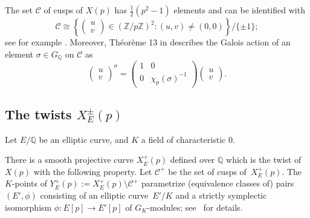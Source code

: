 \documentclass[12pt]{amsart}
\numberwithin{equation}{section}
\theoremstyle{definition}
\newcommand{\Q}{\mathbb{Q}}
\newcommand{\Z}{\mathbb{Z}}
\newcommand{\cC}{\mathcal{C}}
\begin{document}
The set $\cC$ of cusps of $X(p)$ has $\frac{1}{2}(p^2-1)$ elements and can be identified with 
\[\cC \cong \left\{\begin{pmatrix} u \\ v \end{pmatrix} \in (\Z/p\Z)^2 : (u, v) \neq (0,0) \right\} / \{ \pm 1 \};\]
see for example \cite[\S2.8.2]{Halberstadt}.
Moreover, Th\'eor\`eme 13 in \cite[p. 302]{Halberstadt} describes the Galois action of an element $\sigma \in G_\Q$ on $\cC$  as 
\begin{equation}\label{E:actionOnC}
  \begin{pmatrix} u \\ v \end{pmatrix}^\sigma = \begin{pmatrix}
				1 & 0 \\
				0 & \chi_p(\sigma)^{-1}
			\end{pmatrix}\begin{pmatrix} u \\ v \end{pmatrix}.
\end{equation}


\subsection{The twists \texorpdfstring{$X_E^\pm(p)$}{}}\label{sec:XEp}
Let $E/\Q$ be an elliptic curve, and $K$ a field of characteristic 0.

There is a smooth projective curve $X_E^+(p)$ defined over $\Q$ which is the twist of $X(p)$ with the following property. Let $\cC^+$ be the set of cusps of~$X_E^+(p)$. The $K$-points
of $Y_E^+(p) := X_E^+(p) \setminus \cC^+$
parametrize (equivalence classes of) pairs $(E', \phi)$ consisting of an elliptic curve~$E'/K$
and a strictly symplectic isomorphism $\phi : E[p] \to E'[p]$ of $G_K$-modules;
see~\cite[\S 5.3]{Halberstadt} for details.
\end{document}

